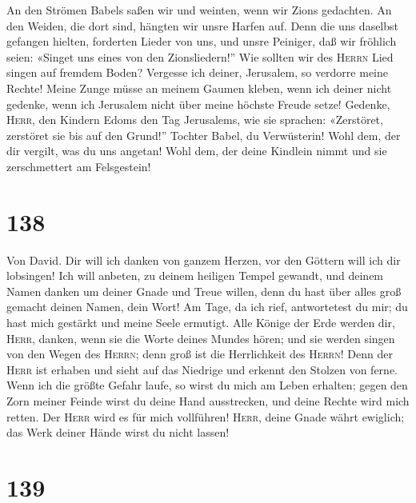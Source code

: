  An den Strömen Babels saßen wir und weinten, wenn wir
Zions gedachten.  An den Weiden, die dort sind, hängten
wir unsre Harfen auf.  Denn die uns daselbst gefangen
hielten, forderten Lieder von uns, und unsre Peiniger, daß wir fröhlich
seien: «Singet uns eines von den Zionsliedern!''  Wie
sollten wir des \textsc{Herrn} Lied singen auf fremdem Boden?
 Vergesse ich deiner, Jerusalem, so verdorre meine Rechte!
 Meine Zunge müsse an meinem Gaumen kleben, wenn ich
deiner nicht gedenke, wenn ich Jerusalem nicht über meine höchste Freude
setze!  Gedenke, \textsc{Herr}, den Kindern Edoms den Tag
Jerusalems, wie sie sprachen: «Zerstöret, zerstöret sie bis auf den
Grund!''  Tochter Babel, du Verwüsterin! Wohl dem, der dir
vergilt, was du uns angetan!  Wohl dem, der deine Kindlein
nimmt und sie zerschmettert am Felsgestein!

\hypertarget{section-137}{%
\section{138}\label{section-137}}

 Von David. Dir will ich danken von ganzem Herzen, vor den
Göttern will ich dir lobsingen!  Ich will anbeten, zu
deinem heiligen Tempel gewandt, und deinem Namen danken um deiner Gnade
und Treue willen, denn du hast über alles groß gemacht deinen Namen,
dein Wort!  Am Tage, da ich rief, antwortetest du mir; du
hast mich gestärkt und meine Seele ermutigt.  Alle Könige
der Erde werden dir, \textsc{Herr}, danken, wenn sie die Worte deines
Mundes hören;  und sie werden singen von den Wegen des
\textsc{Herrn}; denn groß ist die Herrlichkeit des \textsc{Herrn}!
 Denn der \textsc{Herr} ist erhaben und sieht auf das
Niedrige und erkennt den Stolzen von ferne.  Wenn ich die
größte Gefahr laufe, so wirst du mich am Leben erhalten; gegen den Zorn
meiner Feinde wirst du deine Hand ausstrecken, und deine Rechte wird
mich retten.  Der \textsc{Herr} wird es für mich
vollführen! \textsc{Herr}, deine Gnade währt ewiglich; das Werk deiner
Hände wirst du nicht lassen!

\hypertarget{section-138}{%
\section{139}\label{section-138}}

